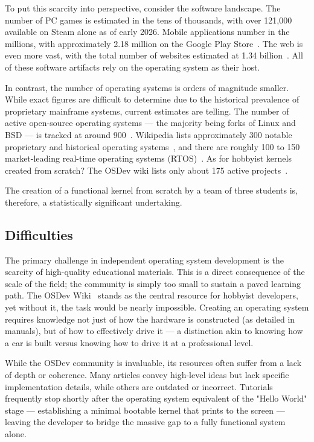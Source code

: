 \documentclass[a4paper,10pt,twoside]{report}
\theoremstyle{definition}
\begin{document}
To put this scarcity into perspective, consider the software landscape. The number of PC games is estimated in the tens of thousands, with over 121,000 available on Steam alone as of early 2026. Mobile applications number in the millions, with approximately 2.18 million on the Google Play Store~\cite{stats_google_play}. The web is even more vast, with the total number of websites estimated at 1.34 billion~\cite{stats_websites}. All of these software artifacts rely on the operating system as their host.

In contrast, the number of operating systems is orders of magnitude smaller. While exact figures are difficult to determine due to the historical prevalence of proprietary mainframe systems, current estimates are telling. The number of active open-source operating systems --- the majority being forks of Linux and BSD --- is tracked at around 900~\cite{stats_distrowatch}. Wikipedia lists approximately 300 notable proprietary and historical operating systems~\cite{wiki_list_os}, and there are roughly 100 to 150 market-leading real-time operating systems (RTOS)~\cite{wiki_rtos}. As for hobbyist kernels created from scratch? The OSDev wiki lists only about 175 active projects~\cite{osdev_projects}.

The creation of a functional kernel from scratch by a team of three students is, therefore, a statistically significant undertaking.

\subsection{Difficulties}

The primary challenge in independent operating system development is the scarcity of high-quality educational materials. This is a direct consequence of the scale of the field; the community is simply too small to sustain a paved learning path. The OSDev Wiki~\cite{osdev_main} stands as the central resource for hobbyist developers, yet without it, the task would be nearly impossible. Creating an operating system requires knowledge not just of how the hardware is constructed (as detailed in manuals), but of how to effectively drive it --- a distinction akin to knowing how a car is built versus knowing how to drive it at a professional level.

While the OSDev community is invaluable, its resources often suffer from a lack of depth or coherence. Many articles convey high-level ideas but lack specific implementation details, while others are outdated or incorrect. Tutorials frequently stop shortly after the operating system equivalent of the "Hello World" stage --- establishing a minimal bootable kernel that prints to the screen --- leaving the developer to bridge the massive gap to a fully functional system alone.
\end{document}
